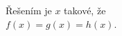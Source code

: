 \documentclass[preview]{standalone}
\begin{document}
\begin{center}
Řešením je $x$ takové, že\\ $f(x)=g(x)=h(x)$.
\end{center}
\end{document}
